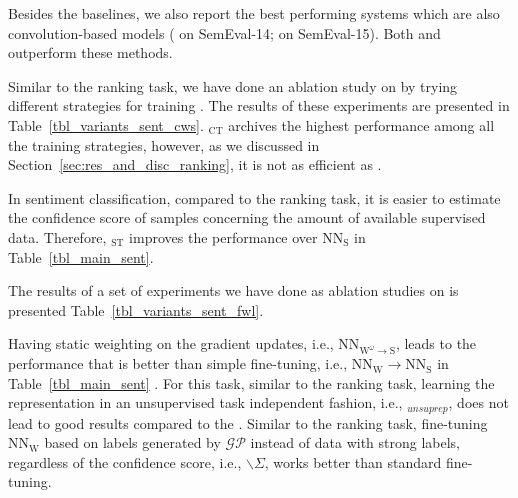 Besides the baselines, we also report the best performing systems which are also convolution-based models (\citealt{Rouvier:2016} on SemEval-14; \citealt{Deriu2016:SemEval} on SemEval-15). Both \cws and \fwl outperform these methods.



Similar to the ranking task, we have done an ablation study on \cws by trying different strategies for training \cws. The results of these experiments are presented in Table~\ref{tbl_variants_sent_cws}. \cws$_\text{CT}$ archives the highest performance among all the training strategies, however, as we discussed in Section~\ref{sec:res_and_disc_ranking}, it is not as efficient as \cws. 

In sentiment classification, compared to the ranking task, it is easier to estimate the confidence score of samples concerning the amount of available supervised data. Therefore, \cws$_\text{ST}$ improves the performance over $\text{NN}_{\text{S}}$ in Table~\ref{tbl_main_sent}. 



The results of a set of experiments we have done as ablation studies on \fwl is presented Table~\ref{tbl_variants_sent_fwl}. 

Having static weighting on the gradient updates, i.e., NN$_{\text{W}^\omega \to \text{S}}$, leads to the performance that is better than simple fine-tuning, i.e., $\text{NN}_{\text{W}} \to \text{NN}_{\text{S}}$ in Table~\ref{tbl_main_sent} .
%
For this task, similar to the ranking task, learning the representation in an unsupervised task independent fashion, i.e., \fwlnospace$_{unsuprep}$, does not lead to good results compared to the \fwl.
%
Similar to the ranking task, fine-tuning $\text{NN}_{\text{W}}$ based on labels generated by $\mathcal{GP}$ instead of data with strong labels, regardless of the confidence score, i.e., \fwl$\backslash\Sigma$, works better than standard fine-tuning. 